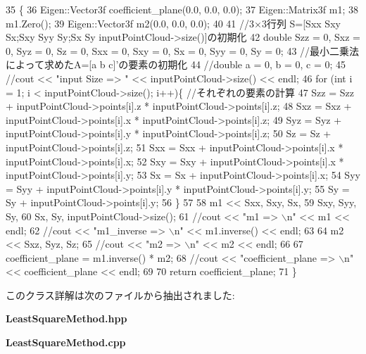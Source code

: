\begin{DoxyCode}
35 \{
36     Eigen::Vector3f coefficient\_plane(0.0, 0.0, 0.0);
37     Eigen::Matrix3f m1;
38     m1.Zero();
39     Eigen::Vector3f m2(0.0, 0.0, 0.0);
40 
41     \textcolor{comment}{//3×3行列 S=[Sxx Sxy Sx;Sxy Syy Sy;Sx Sy inputPointCloud->size()]の初期化}
42     \textcolor{keywordtype}{double} Szz = 0, Sxz = 0, Syz = 0, Sz = 0, Sxx = 0, Sxy = 0, Sx = 0, Syy = 0, Sy = 0;
43     \textcolor{comment}{//最小二乗法によって求めたA=[a b c]'の要素の初期化}
44     \textcolor{comment}{//double a = 0, b = 0, c = 0;}
45     \textcolor{comment}{//cout << "input Size => " << inputPointCloud->size() << endl;}
46     \textcolor{keywordflow}{for} (\textcolor{keywordtype}{int} i = 1; i < inputPointCloud->size(); i++)\{ \textcolor{comment}{//それぞれの要素の計算}
47         Szz = Szz + inputPointCloud->points[i].z * inputPointCloud->points[i].z;
48         Sxz = Sxz + inputPointCloud->points[i].x * inputPointCloud->points[i].z;
49         Syz = Syz + inputPointCloud->points[i].y * inputPointCloud->points[i].z;
50         Sz = Sz + inputPointCloud->points[i].z;
51         Sxx = Sxx + inputPointCloud->points[i].x * inputPointCloud->points[i].x;
52         Sxy = Sxy + inputPointCloud->points[i].x * inputPointCloud->points[i].y;
53         Sx = Sx + inputPointCloud->points[i].x;
54         Syy = Syy + inputPointCloud->points[i].y * inputPointCloud->points[i].y;
55         Sy = Sy + inputPointCloud->points[i].y;
56     \}
57 
58     m1 << Sxx, Sxy, Sx,
59         Sxy, Syy, Sy,
60         Sx, Sy, inputPointCloud->size();
61     \textcolor{comment}{//cout << "m1 => \(\backslash\)n" << m1 << endl;}
62     \textcolor{comment}{//cout << "m1\_inverse => \(\backslash\)n" << m1.inverse() << endl;}
63 
64     m2 << Sxz, Syz, Sz;
65     \textcolor{comment}{//cout << "m2 => \(\backslash\)n" << m2 << endl;}
66 
67     coefficient\_plane = m1.inverse() * m2;
68     \textcolor{comment}{//cout << "coefficient\_plane => \(\backslash\)n" << coefficient\_plane << endl;}
69 
70     \textcolor{keywordflow}{return} coefficient\_plane;
71 \}
\end{DoxyCode}


このクラス詳解は次のファイルから抽出されました\-:\begin{DoxyCompactItemize}
\item 
{\bf Least\-Square\-Method.\-hpp}\item 
{\bf Least\-Square\-Method.\-cpp}\end{DoxyCompactItemize}
